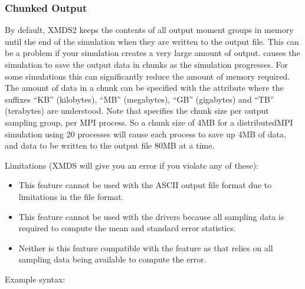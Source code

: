 \documentclass[letterpaper,10pt,english]{sphinxmanual}
\begin{document}
\ignorespaces 

\subsubsection{Chunked Output}
\label{\detokenize{reference_elements:chunked-output}}\label{\detokenize{reference_elements:chunkedoutput}}\label{\detokenize{reference_elements:index-13}}
\sphinxAtStartPar
By default, XMDS2 keeps the contents of all output moment groups in memory until the end of the simulation when they are written to the output file.  This can be a problem if your simulation creates a very large amount of output.   causes the simulation to save the output data in chunks as the simulation progresses.  For some simulations this can significantly reduce the amount of memory required.  The amount of data in a chunk can be specified with the  attribute where the suffixes “KB” (kilobytes), “MB” (megabytes), “GB” (gigabytes) and “TB” (terabytes) are understood.  Note that  specifies the chunk size per output sampling group, per MPI process.  So a chunk size of 4MB for a distributed\sphinxhyphen{}MPI simulation using 20 processes will cause each process to save up 4MB of data, and data to be written to the output file 80MB at a time.

\sphinxAtStartPar
Limitations (XMDS will give you an error if you violate any of these):
\begin{itemize}
\item {} 
\sphinxAtStartPar
This feature cannot be used with the ASCII output file format due to limitations in the file format.

\item {} 
\sphinxAtStartPar
This feature cannot be used with the  drivers because all sampling data is required to compute the mean and standard error statistics.

\item {} 
\sphinxAtStartPar
Neither is this feature compatible with the  feature as that relies on all sampling data being available to compute the error.

\end{itemize}

\sphinxAtStartPar
Example syntax:
\end{document}
